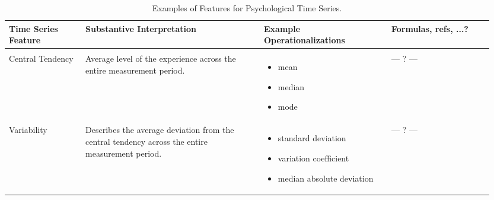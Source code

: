 \begin{sidewaystable}
    \centering
    \caption{Examples of Features for Psychological Time Series.}
    \label{tab:esmFeatures} 
    \begin{tabular}{
    >{\raggedright\arraybackslash}p{0.15\linewidth} 
    >{\raggedright\arraybackslash}p{0.35\linewidth} 
    >{\raggedright\arraybackslash}p{0.25\linewidth} 
    >{\raggedright\arraybackslash}p{0.20\linewidth}
    }
        \hline 
        Time Series Feature & Substantive Interpretation & Example Operationalizations & Formulas, refs, ...? \\ 
        \hline \\ [-0.5em]
        
        
        Central Tendency \linebreak & 
        Average level of the experience across the entire measurement period. \linebreak & 
        \vspace{-1em}
        \begin{itemize}[nosep,leftmargin=*,label={--}]
            \item mean
            \item median
            \item mode
        \end{itemize} \linebreak  & 
        {\centering --- ? ---\par} \\ 
        
        Variability & 
        Describes the average deviation from the central tendency across the entire measurement period. \linebreak & 
        \vspace{-1em}
        \begin{itemize}[nosep,leftmargin=*,label={--}]
            \item standard deviation
            \item variation coefficient
            \item median absolute deviation
        \end{itemize} \linebreak & 
        {\centering --- ? ---\par} \\ 
        

\end{tabular}
\end{sidewaystable}
